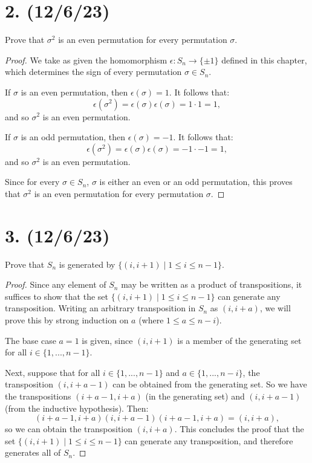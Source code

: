 \documentclass{article}
\begin{document}
\section*{2. (12/6/23)}

Prove that $\sigma^2$ is an even permutation for every permutation $\sigma$.

\begin{proof}
    We take as given the homomorphism $\epsilon: S_n \rightarrow \{ \pm 1 \}$ defined in this chapter, which determines the sign of every permutation $\sigma \in S_n$.

    If $\sigma$ is an even permutation, then $\epsilon(\sigma) = 1$. It follows that:
    \begin{equation*}
        \epsilon(\sigma^2) = \epsilon(\sigma)\epsilon(\sigma) = 1 \cdot 1 = 1,
    \end{equation*}
    and so $\sigma^2$ is an even permutation.

    If $\sigma$ is an odd permutation, then $\epsilon(\sigma) = -1$. It follows that:
    \begin{equation*}
        \epsilon(\sigma^2) = \epsilon(\sigma)\epsilon(\sigma) = -1 \cdot -1 = 1,
    \end{equation*}
    and so $\sigma^2$ is an even permutation.

    Since for every $\sigma \in S_n$, $\sigma$ is either an even or an odd permutation, this proves that $\sigma^2$ is an even permutation for every permutation $\sigma$.
\end{proof}

\section*{3. (12/6/23)}

Prove that $S_n$ is generated by $\{ (i, i + 1) \mid 1 \leq i \leq n - 1 \}$.

\begin{proof}
    Since any element of $S_n$ may be written as a product of transpositions, it suffices to show that the set $\{ (i, i + 1) \mid 1 \leq i \leq n - 1 \}$ can generate any transposition. Writing an arbitrary transposition in $S_n$ as $(i, i + a)$, we will prove this by strong induction on $a$ (where $1 \leq a \leq n - i$).

    The base case $a = 1$ is given, since $(i, i + 1)$ is a member of the generating set for all $i \in \{ 1, ..., n - 1 \}$.

    Next, suppose that for all $i \in \{ 1, ..., n - 1\}$ and $a \in \{ 1, ..., n - i \}$, the transposition $(i, i + a - 1)$ can be obtained from the generating set. So we have the transpositions $(i + a - 1, i + a)$ (in the generating set) and $(i, i + a - 1)$ (from the inductive hypothesis). Then:
    \begin{equation*}
        (i + a - 1, i + a)(i, i + a - 1)(i + a - 1, i + a) = (i, i + a),
    \end{equation*}
    so we can obtain the transposition $(i, i + a)$. This concludes the proof that the set $\{ (i, i + 1) \mid 1 \leq i \leq n - 1 \}$ can generate any transposition, and therefore generates all of $S_n$.
\end{proof}
\end{document}
